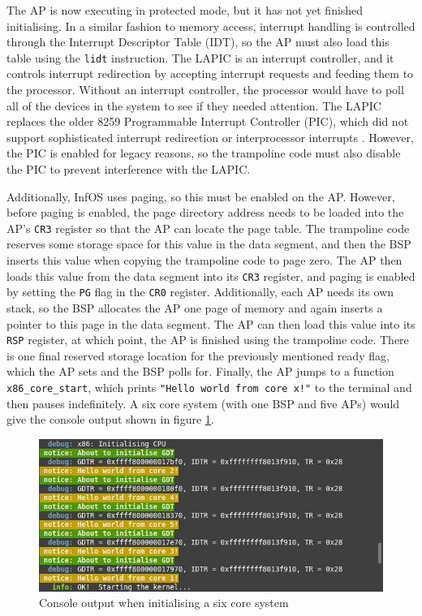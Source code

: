 \documentclass[bsc,frontabs,singlespacing,parskip,deptreport]{infthesis}
\begin{document}
The AP is now executing in protected mode, but it has not yet finished initialising. In a similar fashion to memory access, interrupt handling is controlled through the Interrupt Descriptor Table (IDT), so the AP must also load this table using the \verb|lidt| instruction. The LAPIC is an interrupt controller, and it controls interrupt redirection by accepting interrupt requests and feeding them to the processor. Without an interrupt controller, the processor would have to poll all of the devices in the system to see if they needed attention. The LAPIC replaces the older 8259 Programmable Interrupt Controller (PIC), which did not support sophisticated interrupt redirection or interprocessor interrupts \cite{osdev-apic}. However, the PIC is enabled for legacy reasons, so the trampoline code must also disable the PIC to prevent interference with the LAPIC. 

Additionally, InfOS uses paging, so this must be enabled on the AP. However, before paging is enabled, the page directory address needs to be loaded into the AP's \verb|CR3| register so that the AP can locate the page table. The trampoline code reserves some storage space for this value in the data segment, and then the BSP inserts this value when copying the trampoline code to page zero. The AP then loads this value from the data segment into its \verb|CR3| register, and paging is enabled by setting the \verb|PG| flag in the \verb|CR0| register. Additionally, each AP needs its own stack, so the BSP allocates the AP one page of memory and again inserts a pointer to this page in the data segment. The AP can then load this value into its \verb|RSP| register, at which point, the AP is finished using the trampoline code. There is one final reserved storage location for the previously mentioned ready flag, which the AP sets and the BSP polls for. Finally, the AP jumps to a function \verb|x86_core_start|, which prints \verb|"Hello world from core x!"| to the terminal and then pauses indefinitely. A six core system (with one BSP and five APs) would give the console output shown in figure \ref{hello-world}.

\begin{figure}[h]
    \centering
    \includegraphics[scale=0.6]{figures/hello-world.jpg}
    \caption{Console output when initialising a six core system}
    \label{hello-world}
\end{figure}
\end{document}
